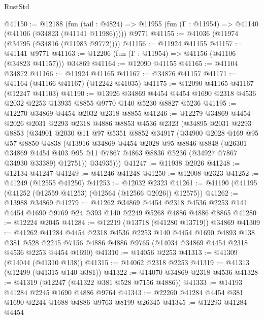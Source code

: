 \begin{lexlean}{RustStd}
\begin{coremodule}
{\begin{coremodule}
{{{{{{{{{{{{{{{{{{{{{{{{{{{{{{{{{{{{{{{{{{{{{{{{{{{{{{{{{{{{{{{{{{{{{{{{{{{{{{{{@41150 := @12188
    (fun (tail : @4824) => @11955 (fun (Γ : @11954) => @41140 (@41106 (@34823 (@41141 @11986)))))
    @9771
@41155 := @41036 (@11974 (@34795 (@34816 (@11983 @9772))))
@41156 := @11924 @41155
@41157 := @41141 @9771
@41163 := @12206 (fun (Γ : @11954) => @41156 (@41106 (@34823 @41157))) @34869
@41164 := @12090 @41155
@41165 := @41104 @34872
@41166 := @11924 @41165
@41167 := @34876 @41157
@41171 := @41164 (@41166 @41167) (@12242 @41035)
@41175 := @12090 @41165 @41167 (@12247 @41103)
@41190 := @13926
    @34869
    @4454
    @4454
    @1690
    @2318
    @4536
    @2032
    @2253
    @13935
    @8855
    @9770
    @140
    @5230
    @8827
    @5236
@41195 := @12270 @34869 @4454 @2032 @2318 @8855
@41246 := @12279
    @34869
    @4454
    @2026
    @2031
    @2293
    @2318
    @4886
    @8853
    @4536
    @2323
    (@34895
      @2031
      @2293
      @8853
      (@34901
        @2030
        @11
        @97
        @5351
        @8852
        @34917
        (@34900
          @2028
          @169
          @95
          @57
          @8850
          @4838
          (@13916
            @34869
            @4454
            @2028
            @95
            @8846
            @8848
            (@26301
              @34869
              @4454
              @403
              @95
              @11
              @7867
              @4863
              @8836
              @5236
              (@34927 @7867 @34930 @33389)
              @12751))
          @34935)))
@41247 := @11938 @2026
@41248 := @12134 @41247
@41249 := @41246 @41248
@41250 := @12008 @2323
@41252 := @41249 (@12555 @41250)
@41253 := @12032 @2323
@41261 := @41190 (@41195 (@41252 (@12559 @41253) (@12564 (@12566 @2026)) @12575))
@41262 := @13988 @34869
@41279 := @41262
    @34869
    @4454
    @2318
    @4536
    @2253
    @141
    @4454
    @1690
    @9769
    @24
    @393
    @140
    @2249
    @5268
    @4886
    @4886
    @8865
@41280 := @12224 @2045
@41284 := @12219 (@13718 (@41280 @13719)) @34869
@41309 := @41262
    @41284
    @4454
    @2318
    @4536
    @2253
    @140
    @4454
    @1690
    @4893
    @138
    @381
    @528
    @2245
    @7156
    @4886
    @4886
    @9765
    (@14034 @34869 @4454 @2318 @4536 @2253 @4454 @1690)
@41310 := @14056 @2253
@41313 := @41309 (@14044 (@41310 @138))
@41315 := @14062 @2318 @2253
@41319 := @41313 (@12499 (@41315 @140 @381))
@41322 := @14070 @34869 @2318 @4536
@41328 := @41319 (@12247 (@41322 @381 @528 @7156 @4886))
@41333 := @14193 @41284 @2245 @1690 @4886 @9764
@41343 := @22260 @41284 @4454 @381 @1690 @2244 @1688 @4886 @9763 @8199 @26345
@41345 := @12293 @41284 @4454
}}}}}}}}}}}}}}}}}}}}}}}}}}}}}}}}}}}}}}}}}}}}}}}}}}}}}}}}}}}}}}}}}}}}}}}}}}}}}}}}
\end{coremodule}}
\end{coremodule}
\end{lexlean}
